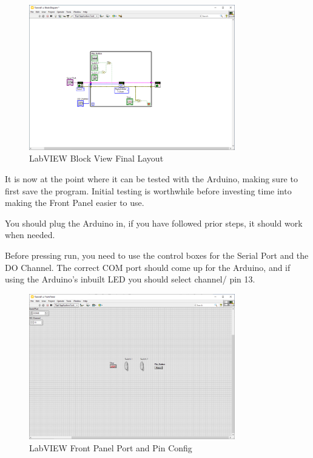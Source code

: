\documentclass[a4paper,11pt]{report}
\begin{document}
\begin{figure}[H]
\centering
\includegraphics[width=0.8\textwidth]{screenshots/labview28}
\caption{LabVIEW Block View Final Layout}
\end{figure}

It is now at the point where it can be tested with the Arduino, making sure to first save the program. Initial testing is worthwhile before investing time into making the Front Panel easier to use.

You should plug the Arduino in, if you have followed prior steps, it should work when needed.

Before pressing run, you need to use the control boxes for the Serial Port and the DO Channel. The correct COM port should come up for the Arduino, and if using the Arduino's inbuilt LED you should select channel/ pin 13.

\begin{figure}[H]
\centering
\includegraphics[width=0.8\textwidth]{screenshots/labview29}
\caption{LabVIEW Front Panel Port and Pin Config}
\end{figure}
\end{document}
